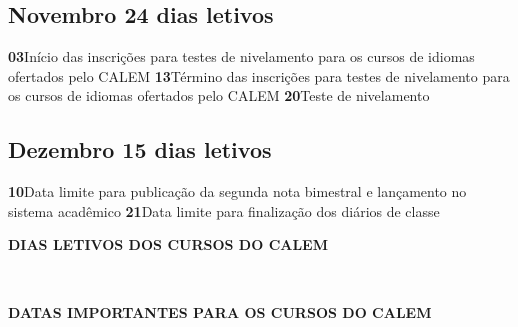 \documentclass[thesis]{hmcposter}
\begin{document}
\begin{poster}
							\subsection{Novembro \hfill 24 dias letivos}\textbf{03}\qquad Início das inscrições para testes de nivelamento para os cursos de
idiomas ofertados pelo CALEM \newline \null\textbf{13}\qquad Término das inscrições para testes de nivelamento para os cursos
de idiomas ofertados pelo CALEM \newline \null\textbf{20}\qquad Teste de nivelamento \newline \null\subsection{Dezembro \hfill 15 dias letivos}\textbf{10}\qquad Data limite para publicação da segunda nota bimestral e lançamento no sistema acadêmico \newline \null\textbf{21}\qquad Data limite para finalização dos diários de classe \newline \null\newpage
~
\vfill
\begin{center}
\large \textbf{DIAS LETIVOS DOS CURSOS DO CALEM}
\newline
\null
\newline
\begin{table}
\centering
{}
\end{table}
\newline
\null
\newline
\end{center}
\vfill
\null
\columnbreak
~
\vfill
\begin{center}
\large \textbf{DATAS IMPORTANTES PARA OS CURSOS DO CALEM}
\newline
\null
\newline
\begin{table}
\centering

\end{table}
\end{center}
\end{poster}
\end{document}
